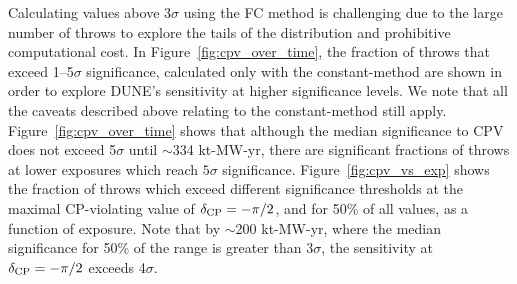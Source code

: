 Calculating \dchisqcrit values above 3$\sigma$ using the FC method is challenging due to the large number of throws to explore the tails of the \dchisqFC distribution and prohibitive computational cost. In Figure~\ref{fig:cpv_over_time}, the fraction of throws that exceed 1--5$\sigma$ significance, calculated only with the constant-\dchisq method are shown in order to explore DUNE's sensitivity at higher significance levels. We note that all the caveats described above relating to the constant-\dchisq method still apply. Figure~\ref{fig:cpv_over_time} shows that although the median significance to CPV does not exceed 5$\sigma$ until $\sim$334 kt-MW-yr, there are significant fractions of throws at lower exposures which reach $5\sigma$ significance. Figure~\ref{fig:cpv_vs_exp} shows the fraction of throws which exceed different significance thresholds at the maximal CP-violating value of $\delta_{\rm CP} = -\pi/2$, and for 50\% of all \deltacp values, as a function of exposure. Note that by $\sim$200 kt-MW-yr, where the median significance for 50\% of the \deltacp range is greater than 3$\sigma$, the sensitivity at $\delta_{\rm CP} = -\pi/2$ exceeds 4$\sigma$.

\FloatBarrier
